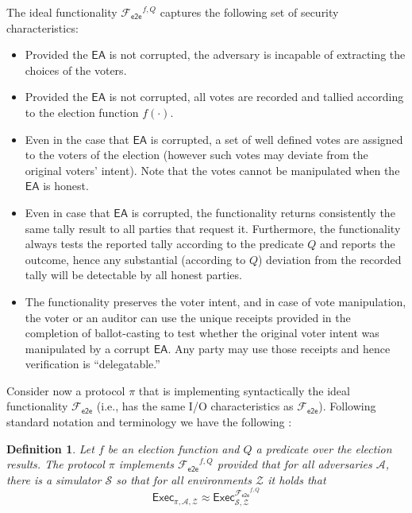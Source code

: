 \documentclass[11pt,letterpaper]{article}
\newcommand{\func}[1][\relax]{\ensuremath{\mathcal{F}_{\mathsf{#1}}}}
\newcommand{\mc}{\mathcal}
\newtheorem{definition}[theorem]{Definition}
\newcommand{\fete}{\func[e2e]}%
\def\EA{\mathsf{EA}}
\def\Exec{\mathsf{Exec}}
\begin{document}
The ideal functionality  $\fete^{f,Q}$ captures the following set of security characteristics: 

\begin{itemize}
\item Provided the $\EA$ is not corrupted, the adversary is incapable of extracting  the choices of the
voters.  

\item Provided the $\EA$ is not corrupted, all votes are recorded and tallied according to the election function $f(\cdot)$. 

\item Even in the case that $\EA$ is corrupted, a set of well defined votes are assigned to the voters of the election
(however  such votes may deviate from the original voters' intent). Note that the votes cannot be manipulated when 
the $\EA$ is honest. 

\item Even in  case that $\EA$ is corrupted, the functionality returns consistently 
the same tally result to all parties that request it. Furthermore, the functionality always tests
the reported tally according to the predicate $Q$ and reports the outcome, 
hence any substantial (according to $Q$) deviation from the recorded tally will be  detectable by all
honest parties. 

\item The functionality preserves the voter intent, and in case of vote manipulation, the voter or an auditor
can use the unique receipts provided in the completion of ballot-casting to test whether the original 
voter intent was  manipulated by a corrupt $\EA$. Any party may use those receipts and hence verification is  ``delegatable.'' 
\end{itemize}

Consider now a protocol $\pi$ that is implementing syntactically the ideal functionality
$\fete$ (i.e., has the same I/O characteristics as $\fete$). Following standard
notation and terminology we have the following : 


\begin{definition}
Let $f$ be an election function and $Q$ a predicate over the election results. 
The protocol $\pi$ implements $\fete^{f,Q}$  provided that for all adversaries $\mc{A}$, there
is a simulator $\mc{S}$ so that for all environments $\mc{Z}$ it holds that 
\[ \Exec_{\pi, \mc{A}, \mc{Z}} \approx \Exec^{\fete^{f,Q}}_{\mc{S},\mc{Z}} \]
\end{definition}
\end{document}
